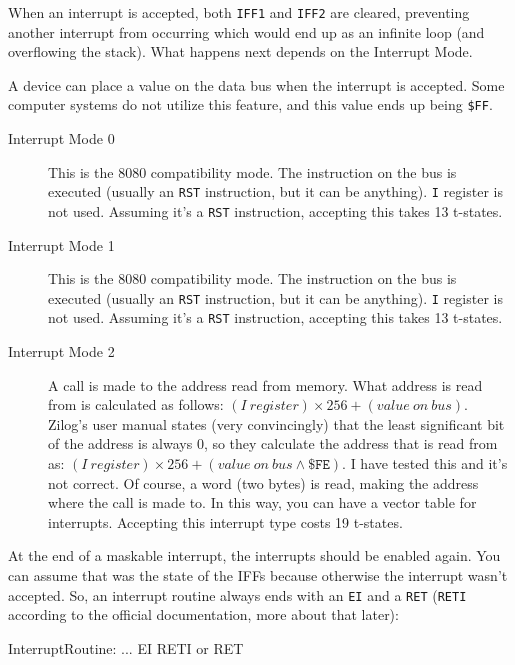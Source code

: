 When an interrupt is accepted, both {\tt IFF1} and {\tt IFF2} are cleared, preventing another interrupt from occurring which would end up as an infinite loop (and overflowing the stack). What happens next depends on the Interrupt Mode.

A device can place a value on the data bus when the interrupt is accepted. Some computer systems do not utilize this feature, and this value ends up being {\tt \$FF}.

\begin{description}

	\item[Interrupt Mode 0]
	This is the 8080 compatibility mode. The instruction on the bus is executed (usually an {\tt RST} instruction, but it can be anything). {\tt I} register is not used. Assuming it's a {\tt RST} instruction, accepting this takes 13 t-states.

	\item[Interrupt Mode 1]
	This is the 8080 compatibility mode. The instruction on the bus is executed (usually an {\tt RST} instruction, but it can be anything). {\tt I} register is not used. Assuming it's a {\tt RST} instruction, accepting this takes 13 t-states.

	\item[Interrupt Mode 2]
	A call is made to the address read from memory. What address is read from is calculated as follows: $(I\ register) \times 256 + (value\ on\ bus)$. Zilog's user manual states (very convincingly) that the least significant bit of the address is always 0, so they calculate the address that is read from as: $(I\ register) \times 256 + (value\ on\ bus \wedge \mathtt{\$FE})$. I have tested this and it's not correct. Of course, a word (two bytes) is read, making the address where the call is made to. In this way, you can have a vector table for interrupts. Accepting this interrupt type costs 19 t-states.

\end{description}

At the end of a maskable interrupt, the interrupts should be enabled again. You can assume that was the state of the IFFs because otherwise the interrupt wasn't accepted. So, an interrupt routine always ends with an {\tt EI} and a {\tt RET} ({\tt RETI} according to the official documentation, more about that later):

\begin{tcblisting}{}
InterruptRoutine:
	...
	EI
	RETI or RET
\end{tcblisting}


